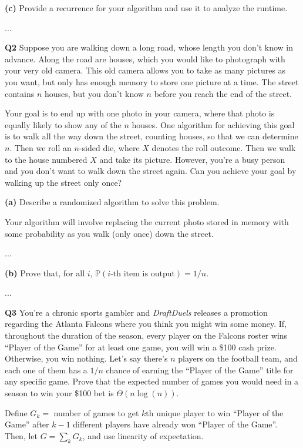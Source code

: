 \documentclass[12pt]{article}
\newcommand{\question}[3][Q]{
\begin{description}
\item \textbf{#1{#2}} #3
\end{description}
}
\newcommand{\hint}[1]{{\footnotesize
    \begin{description}
    [leftmargin=3.3em,style=nextline]
        \item[Hint:] {#1}
    \end{description}}   
}
\renewcommand{\P}{\mathbb{P}}
\begin{document}
\question[]{(c)}{
    Provide a recurrence for your algorithm and use it to analyze the runtime.
}
\begin{answer}
    ...
\end{answer}

\newpage 
\question{2}{ 
    Suppose you are walking down a long road, whose length you don’t know in advance. Along the road are houses, which you would like to photograph with your very old camera. This old camera allows you to take as many pictures as you want, but only has enough memory to store one picture at a time. The street contains $n$ houses, but you don’t know $n$ before you reach the end of the street.

    Your goal is to end up with one photo in your camera, where that photo is equally likely to show any of the $n$ houses. One algorithm for achieving this goal is to walk all the way down the street, counting houses, so that we can determine $n$. Then we roll an $n$-sided die, where $X$ denotes the roll outcome. Then we walk to the house numbered $X$ and take its picture. However, you’re a busy person and you don’t want to walk down the street again. Can you achieve your goal by walking up the street only once? 

\question[]{(a)}{
    Describe a randomized algorithm to solve this problem. 
    
    \hint{Your algorithm will involve replacing the current photo stored in memory with some probability as you walk (only once) down the street.}
}
\begin{answer}
    ...
\end{answer}

\question[]{(b)}{
    Prove that, for all $i$, $\P(\text{$i$-th item is output}) = 1\big/n$.
}
\begin{answer}
    ...
\end{answer}
}

\newpage
\question{3}{
    You're a chronic sports gambler and \textit{DraftDuels} releases a promotion regarding the Atlanta Falcons where you think you might win some money. If, throughout the duration of the season, every player on the Falcons roster wins ``Player of the Game'' for at least one game, you will win a \$100 cash prize. Otherwise, you win nothing. Let's say there's $n$ players on the football team, and each one of them has a $1/n$ chance of earning the ``Player of the Game'' title for any specific game. Prove that the expected number of games you would need in a season to win your \$100 bet is $\Theta(n\log(n))$.

    \hint{Define $G_k = $ number of games to get $k$th unique player to win ``Player of the Game'' after $k-1$ different players have already won ``Player of the Game''. Then, let $G = \sum_k G_k$, and use linearity of expectation.}
    
}
\end{document}
